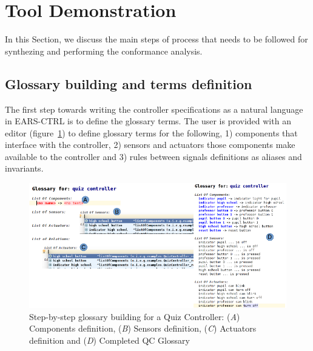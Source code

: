 \vspace{-.5cm}
\section{Tool Demonstration}
\label{sec:demo}
\vspace{-.3cm}
In this Section, we discuss the main steps of process that needs to be followed
for synthezing and performing the conformance analysis.
\vspace{-.3cm}
\subsection{Glossary building and terms definition}
\vspace{-.2cm}
The first step towards writing the controller specifications as a natural
language in \textsf{EARS-CTRL} is to define the glossary terms. 
The user is provided with an editor
(figure~\ref{fig:glossary_def}) to define glossary terms for the following,
1) components that interface with the controller, 2) sensors and actuators those components make available to the controller and 3) rules between
signals definitions as aliases and invariants.
\vspace{-.2cm}
\begin{figure}[!h]
\centering
\includegraphics[width=1\textwidth]{./images/QC_Glossary_Def.png}
\caption{Step-by-step glossary building for a Quiz Controller: (\emph{A})
Components definition, (\emph{B}) Sensors definition, (\emph{C}) Actuators
definition and (\emph{D}) Completed QC Glossary}
\label{fig:glossary_def}
\end{figure}
\vspace{-.2cm}
